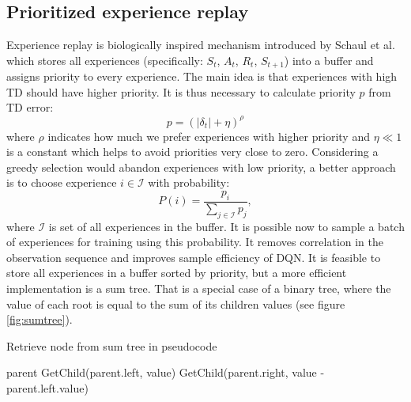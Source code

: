 \clearpage

\subsection{Prioritized experience replay}
Experience replay is biologically inspired mechanism introduced by Schaul et al. \cite{schaul2015} which stores all experiences (specifically: $S_t$, $A_t$, $R_{t}$, $S_{t+1}$) into a buffer and assigns priority to every experience. The main idea is that experiences with high TD should have higher priority. It is thus necessary to calculate priority $p$ from TD error:
\begin{equation}
p = (|\delta_t | + \eta)^\rho
\end{equation}
where $\rho$ indicates how much we prefer experiences with higher priority and $\eta \ll 1$ is a constant which helps to avoid priorities very close to zero. Considering a greedy selection would abandon experiences with low priority, a better approach is to choose experience $i \in \mathcal{I}$ with probability:
\begin{equation}
P(i) = \frac{p_i}{\sum_{j \in \mathcal{I}} p_j},
\end{equation}
where $\mathcal{I}$ is set of all experiences in the buffer. It is possible now to sample a batch of experiences for training using this probability. It removes correlation in the observation sequence and improves sample efficiency of DQN. It is feasible to store all experiences in a buffer sorted by priority, but a more efficient implementation is a sum tree. That is a special case of a binary tree, where the value of each root is equal to the sum of its children values (see figure \ref{fig:sumtree}).
\vspace{5mm}
\begin{algorithm}
\caption{Retrieve node from sum tree in pseudocode}
\begin{algorithmic}[1]
\State \Return parent
\EndIf
{} 
\State \Return GetChild(parent.left, value)
\Else 
\State \Return GetChild(parent.right, value - parent.left.value)
\EndIf
\EndProcedure
\end{algorithmic}
\end{algorithm}
\clearpage
